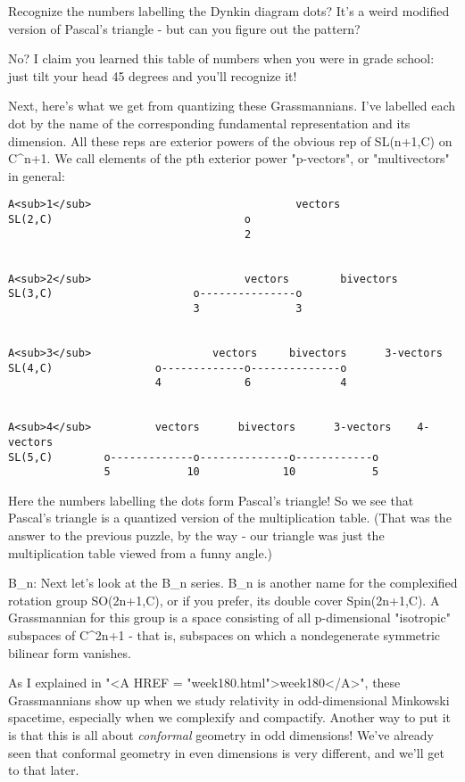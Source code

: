 Recognize the numbers labelling the Dynkin diagram dots?  It's a weird
modified version of Pascal's triangle - but can you figure out the pattern?

No?  I claim you learned this table of numbers when you were in grade
school: just tilt your head 45 degrees and you'll recognize it!

Next, here's what we get from quantizing these Grassmannians.  I've
labelled each dot by the name of the corresponding fundamental
representation and its dimension.  All these reps are exterior powers 
of the obvious rep of SL(n+1,C) on C^{n+1}.  We call elements of the pth
exterior power "p-vectors", or "multivectors" in general:

\begin{verbatim}
A<sub>1</sub>                                vectors 
SL(2,C)                              o
                                     2


A<sub>2</sub>                        vectors        bivectors
SL(3,C)                      o---------------o
                             3               3


A<sub>3</sub>                   vectors     bivectors      3-vectors
SL(4,C)                o-------------o--------------o
                       4             6              4


A<sub>4</sub>          vectors      bivectors      3-vectors    4-vectors
SL(5,C)        o-------------o--------------o------------o
               5            10             10            5
\end{verbatim}
    
Here the numbers labelling the dots form Pascal's triangle!    So we 
see that Pascal's triangle is a quantized version of the multiplication
table.  (That was the answer to the previous puzzle, by the way - our
triangle was just the multiplication table viewed from a funny angle.)

B_{n}: Next let's look at the B_{n} series.  B_{n} is another name for the
complexified rotation group SO(2n+1,C), or if you prefer, its double
cover Spin(2n+1,C).  A Grassmannian for this group is a space consisting
of all p-dimensional "isotropic" subspaces of C^{2n+1} - that is,
subspaces on which a nondegenerate symmetric bilinear form vanishes.

As I explained in "<A HREF = "week180.html">week180</A>",
these Grassmannians show up when we study relativity in odd-dimensional
Minkowski spacetime, especially when we complexify and compactify.
Another way to put it is that this is all about \emph{conformal}
geometry in odd dimensions!  We've already seen that conformal geometry
in even dimensions is very different, and we'll get to that later.


